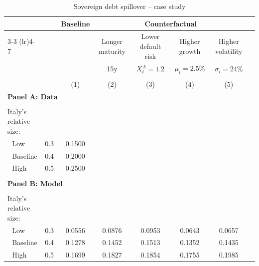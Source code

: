 \begin{table}[h]
\small
\centering
\caption{Sovereign debt spillover -- case study}
\label{tab:table_CPE_spillover}
\begin{tabular*}{\textwidth}{@{\extracolsep{\fill}}llcccccc}
\toprule
 & & \multicolumn{1}{c}{\textbf{Baseline}} & \multicolumn{4}{c}{\textbf{Counterfactual}} \\
\cmidrule(lr){3-3} \cmidrule(lr){4-7}
 & & \multicolumn{1}{c}{} & \multicolumn{1}{c}{Longer maturity} & \multicolumn{1}{c}{Lower default risk} & \multicolumn{1}{c}{Higher growth} & \multicolumn{1}{c}{Higher volatility} \\
 & & \multicolumn{1}{c}{} & \multicolumn{1}{c}{15y} & \multicolumn{1}{c}{$X^A_t = 1.2$} & \multicolumn{1}{c}{$\mu_i = 2.5\%$} & \multicolumn{1}{c}{$\sigma_i = 24\%$} \\
\\
& &  (1) & (2) & (3) & (4) &(5) \\
\multicolumn{7}{l}{\textbf{Panel A: Data}} \\
\midrule \\
Italy's relative size: & & & & & & \\
\,\, Low & 0.3 & 0.1500 & & & & \\
\,\, Baseline & 0.4 & 0.2000 & & & & \\
\,\, High & 0.5 & 0.2500 & & & & \\
\\
\multicolumn{7}{l}{\textbf{Panel B: Model}} \\
\midrule \\
Italy's relative size: & & & & & & \\
\,\, Low & 0.3 & 0.0556 & 0.0876 & 0.0953 & 0.0643 & 0.0657 \\
\,\, Baseline & 0.4 & 0.1278 & 0.1452 & 0.1513 & 0.1352 & 0.1435 \\
\,\, High & 0.5 & 0.1699 & 0.1827 & 0.1854 & 0.1755 & 0.1985 \\
\bottomrule
\end{tabular*}
\end{table}
